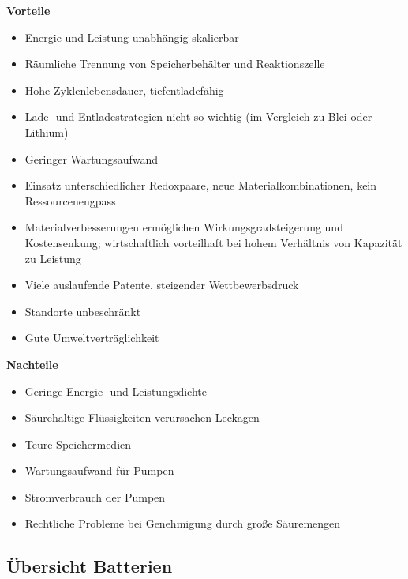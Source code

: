 \begin{minipage}{0.48\textwidth}
\textbf{Vorteile}
\begin{itemize}
  \item Energie und Leistung unabhängig skalierbar
  \item Räumliche Trennung von Speicherbehälter und Reaktionszelle
  \item Hohe Zyklenlebensdauer, tiefentladefähig
  \item Lade- und Entladestrategien nicht so wichtig (im Vergleich zu Blei oder Lithium)
  \item Geringer Wartungsaufwand
  \item Einsatz unterschiedlicher Redoxpaare, neue Materialkombinationen, kein Ressourcenengpass
  \item Materialverbesserungen ermöglichen Wirkungsgradsteigerung und Kostensenkung; wirtschaftlich vorteilhaft bei hohem Verhältnis von Kapazität zu Leistung
  \item Viele auslaufende Patente, steigender Wettbewerbsdruck
  \item Standorte unbeschränkt
  \item Gute Umweltverträglichkeit
\end{itemize}
\end{minipage}
\hfill
\begin{minipage}{0.48\textwidth}
\textbf{Nachteile}
\begin{itemize}
  \item Geringe Energie- und Leistungsdichte
  \item Säurehaltige Flüssigkeiten verursachen Leckagen
  \item Teure Speichermedien
  \item Wartungsaufwand für Pumpen
  \item Stromverbrauch der Pumpen
  \item Rechtliche Probleme bei Genehmigung durch große Säuremengen
\end{itemize}
\end{minipage}





\subsection{Übersicht Batterien}

